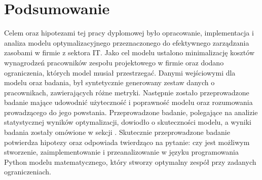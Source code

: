 \chapter*{Podsumowanie}
\par Celem oraz hipotezami tej pracy dyplomowej było opracowanie, implementacja i analiza modelu optymalizacyjnego przeznaczonego do efektywnego zarządzania zasobami w firmie z sektora IT. Jako cel modelu ustalono minimalizację kosztów wynagrodzeń pracowników zespołu projektowego w firmie oraz dodano ograniczenia, których model musiał przestrzegać. Danymi wejściowymi dla modelu oraz badania, był syntetycznie generowany zestaw danych o pracownikach, zawierających różne metryki. Następnie zostało przeprowadzone badanie mające udowodnić użyteczność i poprawność modelu oraz rozumowania prowadzącego do jego powstania. Przeprowadzone badanie, polegające na analizie statystycznej wyników optymalizacji, dowiodło o skuteczności modelu, a wyniki badania zostały omówione w sekcji . Skutecznie przeprowadzone badanie potwierdza hipotezy oraz odpowiada twierdząco na pytanie: czy jest możliwym stworzenie, zaimplementowanie i przeanalizowanie w języku programowania Python modelu matematycznego, który stworzy optymalny zespół przy zadanych ograniczeniach.

